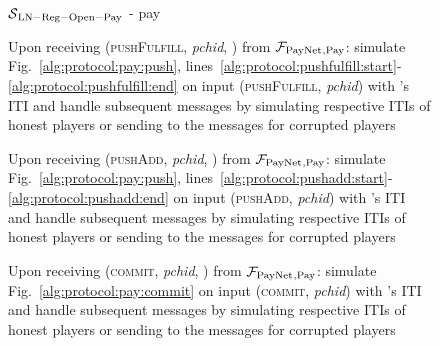 \begin{figure}[H]
\begin{simulatorbox}{$\mathcal{S}{}_{\mathrm{LN - Reg - Open - Pay}}$ - pay}
\begin{algorithmic}[1]
      \State Upon receiving (\textsc{pushFulfill}, \textit{pchid}, \alice) from
      $\mathcal{F}_{\mathrm{PayNet}}{}_{\mathrm{, Pay}}$:
      \Indent
        \State simulate Fig.~\ref{alg:protocol:pay:push},
        lines~\ref{alg:protocol:pushfulfill:start}-\ref{alg:protocol:pushfulfill:end}
        on input (\textsc{pushFulfill}, \textit{pchid}) with \alice's ITI and
        handle subsequent messages by simulating respective ITIs of honest
        players or sending to \adversary{} the messages for corrupted players
        \label{alg:sim:pay:fulfill}
      \EndIndent
      \Statex

      \State Upon receiving (\textsc{pushAdd}, \textit{pchid}, \alice) from
      $\mathcal{F}_{\mathrm{PayNet}}{}_{\mathrm{, Pay}}$:
      \Indent
        \State simulate Fig.~\ref{alg:protocol:pay:push},
        lines~\ref{alg:protocol:pushadd:start}-\ref{alg:protocol:pushadd:end} on
        input (\textsc{pushAdd}, \textit{pchid}) with \alice's ITI and handle
        subsequent messages by simulating respective ITIs of honest players or
        sending to \adversary{} the messages for corrupted players
        \label{alg:sim:pay:add}
      \EndIndent
      \Statex

      \State Upon receiving (\textsc{commit}, \textit{pchid}, \alice) from
      $\mathcal{F}_{\mathrm{PayNet}}{}_{\mathrm{, Pay}}$:
      \Indent
        \State simulate Fig.~\ref{alg:protocol:pay:commit} on input
        (\textsc{commit}, \textit{pchid}) with \alice's ITI and handle
        subsequent messages by simulating respective ITIs of honest players or
        sending to \adversary{} the messages for corrupted players
        \label{alg:sim:pay:commit}
      \EndIndent
    \end{algorithmic}
  \end{simulatorbox}
  \caption{}
  \label{alg:sim:pay}
\end{figure}


